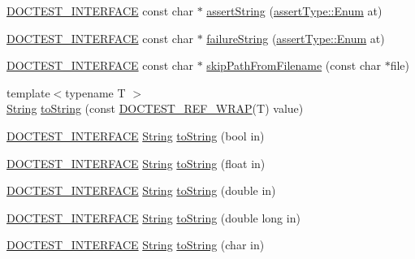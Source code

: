 \begin{DoxyCompactItemize}
\item 
\hyperlink{doctest_8h_a9c16ffc635ec47f07797d21ede26b1a5}{D\+O\+C\+T\+E\+S\+T\+\_\+\+I\+N\+T\+E\+R\+F\+A\+CE} const char $\ast$ \hyperlink{namespacedoctest_aa51be8558a5ec9675a77d2ecbc08e663}{assert\+String} (\hyperlink{namespacedoctest_1_1assert_type_ae1bb5bed722f34f1c38b83cb19d326d3}{assert\+Type\+::\+Enum} at)
\item 
\hyperlink{doctest_8h_a9c16ffc635ec47f07797d21ede26b1a5}{D\+O\+C\+T\+E\+S\+T\+\_\+\+I\+N\+T\+E\+R\+F\+A\+CE} const char $\ast$ \hyperlink{namespacedoctest_a9d2d487c802fb0e66172a0ed2c9f76db}{failure\+String} (\hyperlink{namespacedoctest_1_1assert_type_ae1bb5bed722f34f1c38b83cb19d326d3}{assert\+Type\+::\+Enum} at)
\item 
\hyperlink{doctest_8h_a9c16ffc635ec47f07797d21ede26b1a5}{D\+O\+C\+T\+E\+S\+T\+\_\+\+I\+N\+T\+E\+R\+F\+A\+CE} const char $\ast$ \hyperlink{namespacedoctest_adb4ee7dd3659dcc165944d73f6e29199}{skip\+Path\+From\+Filename} (const char $\ast$file)
\item 
{\footnotesize template$<$typename T $>$ }\\\hyperlink{classdoctest_1_1_string}{String} \hyperlink{namespacedoctest_a8907bf35788959391343a2304f004e17}{to\+String} (const \hyperlink{doctest_8h_af2901cafb023c57fb672ccb1bf14f2eb}{D\+O\+C\+T\+E\+S\+T\+\_\+\+R\+E\+F\+\_\+\+W\+R\+AP}(T) value)
\item 
\hyperlink{doctest_8h_a9c16ffc635ec47f07797d21ede26b1a5}{D\+O\+C\+T\+E\+S\+T\+\_\+\+I\+N\+T\+E\+R\+F\+A\+CE} \hyperlink{classdoctest_1_1_string}{String} \hyperlink{namespacedoctest_a70fd23e88074d38b9d61476005305df5}{to\+String} (bool in)
\item 
\hyperlink{doctest_8h_a9c16ffc635ec47f07797d21ede26b1a5}{D\+O\+C\+T\+E\+S\+T\+\_\+\+I\+N\+T\+E\+R\+F\+A\+CE} \hyperlink{classdoctest_1_1_string}{String} \hyperlink{namespacedoctest_a68660ce630bd88a551ab3108709e6592}{to\+String} (float in)
\item 
\hyperlink{doctest_8h_a9c16ffc635ec47f07797d21ede26b1a5}{D\+O\+C\+T\+E\+S\+T\+\_\+\+I\+N\+T\+E\+R\+F\+A\+CE} \hyperlink{classdoctest_1_1_string}{String} \hyperlink{namespacedoctest_a43b51978c9505f682cbff9462a02f8af}{to\+String} (double in)
\item 
\hyperlink{doctest_8h_a9c16ffc635ec47f07797d21ede26b1a5}{D\+O\+C\+T\+E\+S\+T\+\_\+\+I\+N\+T\+E\+R\+F\+A\+CE} \hyperlink{classdoctest_1_1_string}{String} \hyperlink{namespacedoctest_ae4e12dd9865bb31f417f9df0c41813cf}{to\+String} (double long in)
\item 
\hyperlink{doctest_8h_a9c16ffc635ec47f07797d21ede26b1a5}{D\+O\+C\+T\+E\+S\+T\+\_\+\+I\+N\+T\+E\+R\+F\+A\+CE} \hyperlink{classdoctest_1_1_string}{String} \hyperlink{namespacedoctest_af106dff2a0c068d301349b754c466378}{to\+String} (char in)

\end{DoxyCompactItemize}
